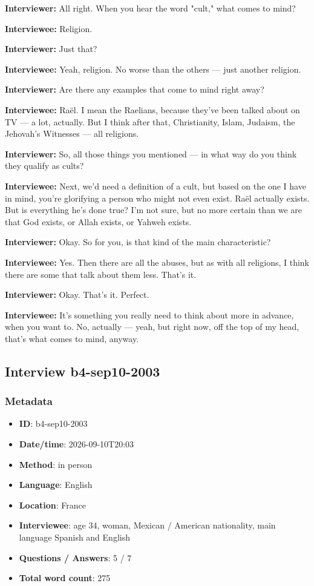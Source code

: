 \textbf{Interviewer:} All right. When you hear the word "cult," what comes to mind?

\textbf{Interviewee:} Religion.

\textbf{Interviewer:} Just that?

\textbf{Interviewee:} Yeah, religion. No worse than the others — just another religion.

\textbf{Interviewer:} Are there any examples that come to mind right away?

\textbf{Interviewee:} Raël. I mean the Raelians, because they've been talked about on TV — a lot, actually. But I think after that, Christianity, Islam, Judaism, the Jehovah's Witnesses — all religions.

\textbf{Interviewer:} So, all those things you mentioned — in what way do you think they qualify as cults?

\textbf{Interviewee:} Next, we'd need a definition of a cult, but based on the one I have in mind, you're glorifying a person who might not even exist. Raël actually exists. But is everything he's done true? I'm not sure, but no more certain than we are that God exists, or Allah exists, or Yahweh exists.

\textbf{Interviewer:} Okay. So for you, is that kind of the main characteristic?

\textbf{Interviewee:} Yes. Then there are all the abuses, but as with all religions, I think there are some that talk about them less. That's it.

\textbf{Interviewer:} Okay. That's it. Perfect.

\textbf{Interviewee:} It's something you really need to think about more in advance, when you want to. No, actually — yeah, but right now, off the top of my head, that's what comes to mind, anyway.

\subsection{Interview b4-sep10-2003}\label{int:b4-sep10-2003}
\subsubsection*{Metadata}
\begin{itemize}
  \item \textbf{ID}: b4-sep10-2003
  \item \textbf{Date/time}: 2026-09-10T20:03
  \item \textbf{Method}: in person
  \item \textbf{Language}: English
  \item \textbf{Location}: France
  \item \textbf{Interviewee}: age 34, woman, Mexican / American nationality, main language Spanish and English
  \item \textbf{Questions / Answers}: 5 / 7
  \item \textbf{Total word count}: 275
\end{itemize}
